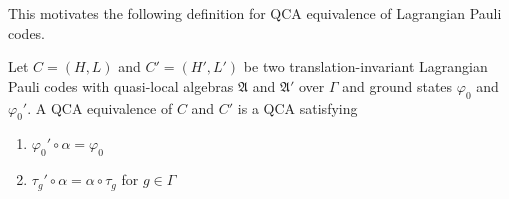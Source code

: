 \documentclass[11pt]{amsart}
\begin{document}
This motivates the following definition for QCA equivalence of Lagrangian Pauli codes.
\begin{defn}
    Let $C=(H,L)$ and $C'=(H',L')$ be two translation-invariant Lagrangian Pauli codes with quasi-local algebras $\mathfrak A$ and $\mathfrak A'$ over $\Gamma$ and ground states $\varphi_0$ and $\varphi_0'$. A QCA equivalence of $C$ and $C'$ is a QCA satisfying
    \begin{enumerate}
        \item $\varphi_0'\circ \alpha =\varphi_0$
        \item $\tau_g'\circ\alpha=\alpha \circ\tau_g $ for $g\in \Gamma$
    \end{enumerate}
\end{defn}

\end{document}
